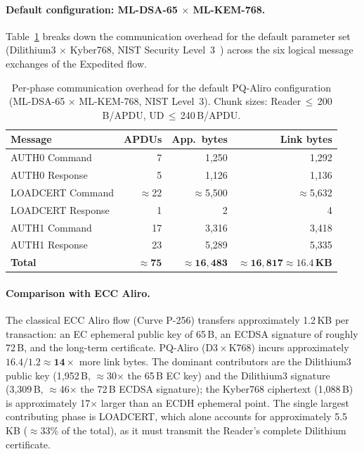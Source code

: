 \paragraph{Default configuration: ML-DSA-65 $\times$ ML-KEM-768.}
Table~\ref{tab:overhead_default} breaks down the communication overhead for
the default parameter set (Dilithium3 $\times$ Kyber768, NIST Security
Level~3~\cite{NIST:FIPS203,NIST:FIPS204}) across the six logical
message exchanges of the Expedited flow.

\begin{table}[t]
\centering
\caption{Per-phase communication overhead for the default PQ-Aliro
configuration (ML-DSA-65 $\times$ ML-KEM-768, NIST Level~3).
Chunk sizes: Reader\,$\le$\,200\,B/APDU, UD\,$\le$\,240\,B/APDU.}
\label{tab:overhead_default}
\begin{tabular}{lrrr}
\hline
\textbf{Message} & \textbf{APDUs} & \textbf{App.\ bytes} & \textbf{Link bytes} \\
\hline
AUTH0 Command   &  7   & 1{,}250   & 1{,}292   \\
AUTH0 Response  &  5   & 1{,}126   & 1{,}136   \\
LOADCERT Command & $\approx$22 & $\approx$5{,}500 & $\approx$5{,}632 \\
LOADCERT Response &  1  &       2   &       4   \\
AUTH1 Command   & 17   & 3{,}316   & 3{,}418   \\
AUTH1 Response  & 23   & 5{,}289   & 5{,}335   \\
\hline
\textbf{Total}  & $\mathbf{\approx 75}$ & $\mathbf{\approx 16{,}483}$ & $\mathbf{\approx 16{,}817 \approx 16.4\,KB}$ \\
\hline
\end{tabular}
\end{table}

\paragraph{Comparison with ECC Aliro.}
The classical ECC Aliro flow (Curve P-256) transfers approximately 1.2\,KB
per transaction: an EC ephemeral public key of 65\,B, an ECDSA signature of
roughly 72\,B, and the long-term certificate.  PQ-Aliro (D3\,$\times$\,K768)
incurs approximately $16.4/1.2 \approx \mathbf{14\times}$ more link bytes.
The dominant contributors are the Dilithium3 public key (1{,}952\,B,
$\approx$30$\times$ the 65\,B EC key) and the Dilithium3 signature
(3{,}309\,B, $\approx$46$\times$ the 72\,B ECDSA signature); the Kyber768
ciphertext (1{,}088\,B) is approximately 17$\times$ larger than an ECDH
ephemeral point.  The single largest contributing phase is LOADCERT, which
alone accounts for approximately 5.5\,KB ($\approx$33\% of the total), as
it must transmit the Reader's complete Dilithium certificate.


